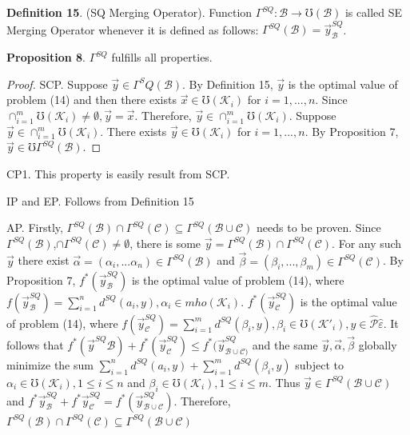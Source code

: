 \documentclass[]{iosart2c}
\begin{document}
  \textbf{Definition 15}. (SQ Merging Operator). Function $\Gamma^{SQ} : \mathcal{B} \to \mho (\mathcal{B})$ is called SE Merging Operator whenever it is defined as follows:
  $\Gamma^{SQ}(\mathcal{B}) = \vec{y}^{SQ}_\mathcal{B}$.

  \textbf{Proposition 8}. $\Gamma^{SQ}$ fulfills all properties.

  \begin{proof}
    SCP. Suppose $\vec{y} \in \Gamma^SQ(\mathcal{B})$. By Definition 15, $\vec{y}$ is the optimal value of problem (14) and then there exists $\vec{x} \in \mho(\mathcal{K}_i)$ for $i = 1, ... , n$. Since $\cap^m_{i=1}\mho(\mathcal{K}_i) \neq \emptyset, \vec{y} = \vec{x}$. Therefore, $\vec{y} \in \cap^m_{i=1}\mho(\mathcal{K}_i)$. Suppose $\vec{y} \in \cap^m_{i=1}\mho(\mathcal{K}_i)$. There exists $\vec{y} \in \mho(\mathcal{K}_i)$ for $i = 1, ... , n$. By Proposition 7, $\vec{y} \in \mho\Gamma^{SQ}(\mathcal{B})$.
  \end{proof}


  CP1. This property is easily result from SCP.

  IP and EP. Follows from Definition 15

  AP. Firstly, $\Gamma^{SQ}(\mathcal{B}) \cap \Gamma^{SQ}(\mathcal{C}) \subseteq \Gamma^{SQ}(\mathcal{B} \cup \mathcal{C})$ needs to be proven. Since $\Gamma^{SQ}(\mathcal{B})$,$\cap\Gamma^{SQ}(\mathcal{C}) \neq \emptyset$, there is some $\vec{y} = \Gamma^{SQ}(\mathcal{B}) \cap \Gamma^{SQ}(\mathcal{C})$. For any such $\vec{y}$ there exist $\vec{\alpha} = (\alpha_i, ... \alpha_n) \in \Gamma^{SQ}(\mathcal{B})$ and $\vec{\beta}= (\beta_i, ... , \beta_m) \in \Gamma^{SQ}(\mathcal{C})$. By Proposition 7, $f^*(\vec{y}^{SQ}_\mathcal{B})$ is the optimal value of problem (14), where $f(\vec{y}^{SQ}_\mathcal{B} ) = \sum^n_{i=1} d^{SQ}(a_i, y), \alpha_i \in mho(\mathcal{K}_i)$. $f^*(\vec{y}^{SQ}_\mathcal{C} )$ is the optimal value of problem (14), where $f (\vec{y}^{SQ}_\mathcal{C} ) = \sum^m_{i=1} d^{SQ}(\beta_i, y), \beta_i \in \mho(\mathcal{K}'_i), y \in \hat{\mathcal{P}} {\hat{\varepsilon}}$. It follows that $f^*(\vec{y}^{SQ} \mathcal{B} ) + f^*(\vec{y}^{SQ}_\mathcal{C} ) \le f^*(\vec{y}^{SQ}_{\mathcal{B}\cup\mathcal{C})}$ and the same $\vec{y}, \vec{\alpha}, \vec{\beta}$ globally minimize the sum $\sum^n_{i=1} d^{SQ}(a_i, y) +\sum^m_{i=1} d^{SQ}(\beta_i, y)$ subject to $\alpha_i \in \mho(\mathcal{K}_i), 1 \le i \le n$ and $\beta_i \in \mho(\mathcal{K}_i), 1 \le i \le m$. Thus $\vec{y} \in \Gamma^{SQ}(\mathcal{B} \cup \mathcal{C})$ and $f^*\vec{y}^{SQ}_\mathcal{B} + f^*\vec{y}^{SQ}_\mathcal{C} = f^*(\vec{y}^{SQ}_{\mathcal{B}\cup\mathcal{C}})$. Therefore, $\Gamma^{SQ}(\mathcal{B}) \cap \Gamma^{SQ}(\mathcal{C}) \subseteq \Gamma^{SQ}(\mathcal{B} \cup \mathcal{C})$
\end{document}
